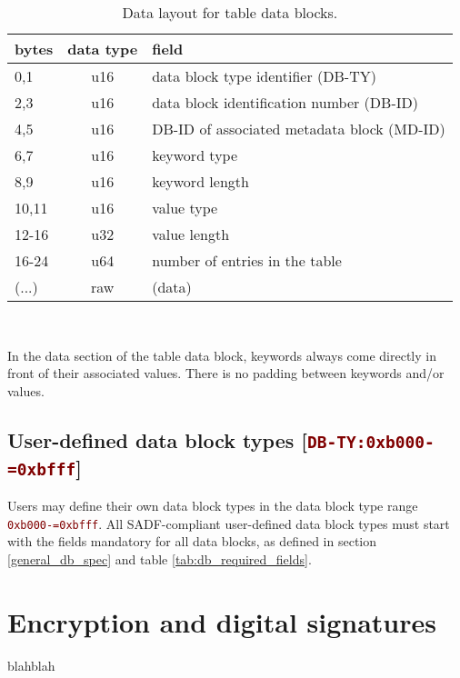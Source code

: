 \documentclass[pagesize=a4]{tufte-book}
\newcommand{\hlred}[1]{\textcolor{Maroon}{#1}}%
\newcommand{\hex}[1]{\hlred{\texttt{#1}}}%
\begin{document}
\begin{table}[ht]
	\centering
	\selectfont
	\begin{tabular}{lcl}
		\toprule
		bytes & data type & field\\
		\midrule
		0,1 & u16 & data block type identifier (DB-TY)\\
		2,3 & u16 & data block identification number (DB-ID)\\
		4,5 & u16 & DB-ID of associated metadata block (MD-ID)\\
		6,7 & u16 & keyword type\\
		8,9 & u16 & keyword length\\
		10,11 & u16 & value type\\
		12-16 & u32 & value length\\
		16-24 & u64 & number of entries in the table\\
 		(...) & raw & (data)\\
		\bottomrule
	\end{tabular}
	~\label{tab:table_fields}
	\caption{Data layout for table data blocks.}	
\end{table}
\vspace{5mm}

In the data section of the table data block, keywords always come directly in front of their associated values. There is no padding between keywords and/or values.

\section{User-defined data block types [\hex{DB-TY:0xb000-=0xbfff}]}
\label{DBTY:0xb000}
Users may define their own data block types in the data block type range \hex{0xb000-=0xbfff}. All SADF-compliant user-defined data block types must start with the fields mandatory for all data blocks, as defined in section \ref{general_db_spec} and table \ref{tab:db_required_fields}.

\chapter{Encryption and digital signatures}
blahblah

\clearpage

\printindex
\end{document}

